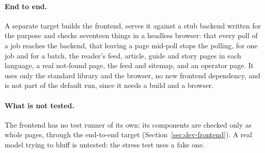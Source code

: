 \paragraph{End to end.} A separate target builds the frontend, serves it
against a stub backend written for the purpose and checks seventeen
things in a headless browser: that every poll of a job reaches the
backend, that leaving a page mid-poll stops the polling, for one job
and for a batch, the reader's feed, article, guide and story pages in each
language, a real not-found page, the feed and sitemap, and an operator
page. It uses only the standard library and the browser, no new
frontend dependency, and is not part of the default run, since it needs
a build and a browser.

\paragraph{What is not tested.} The frontend has no test runner of its
own: its components are checked only as whole pages, through the
end-to-end target (Section~\ref{sec:dev-frontend}). A real model trying to bluff is
untested: the stress test uses a fake one.
